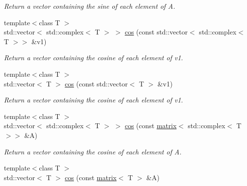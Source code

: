 \begin{DoxyCompactItemize}
\begin{DoxyCompactList}\small\item\em Return a vector containing the sine of each element of A. \end{DoxyCompactList}\item 
\hypertarget{namespacekeycpp_a9b3d958e47ae678b0818a166d5a75883}{{\footnotesize template$<$class T $>$ }\\std\-::vector$<$ std\-::complex$<$ T $>$ $>$ \hyperlink{namespacekeycpp_a9b3d958e47ae678b0818a166d5a75883}{cos} (const std\-::vector$<$ std\-::complex$<$ T $>$$>$ \&v1)}\label{namespacekeycpp_a9b3d958e47ae678b0818a166d5a75883}

\begin{DoxyCompactList}\small\item\em Return a vector containing the cosine of each element of v1. \end{DoxyCompactList}\item 
\hypertarget{namespacekeycpp_a51d6592d124735f2377e1a2c43985b94}{{\footnotesize template$<$class T $>$ }\\std\-::vector$<$ T $>$ \hyperlink{namespacekeycpp_a51d6592d124735f2377e1a2c43985b94}{cos} (const std\-::vector$<$ T $>$ \&v1)}\label{namespacekeycpp_a51d6592d124735f2377e1a2c43985b94}

\begin{DoxyCompactList}\small\item\em Return a vector containing the cosine of each element of v1. \end{DoxyCompactList}\item 
\hypertarget{namespacekeycpp_a6b8f8e6c241ddcb678acf54c03a89b08}{{\footnotesize template$<$class T $>$ }\\std\-::vector$<$ std\-::complex$<$ T $>$ $>$ \hyperlink{namespacekeycpp_a6b8f8e6c241ddcb678acf54c03a89b08}{cos} (const \hyperlink{classkeycpp_1_1matrix}{matrix}$<$ std\-::complex$<$ T $>$$>$ \&A)}\label{namespacekeycpp_a6b8f8e6c241ddcb678acf54c03a89b08}

\begin{DoxyCompactList}\small\item\em Return a vector containing the cosine of each element of A. \end{DoxyCompactList}\item 
\hypertarget{namespacekeycpp_abc28105b536bc99365073d7cbe0f9910}{{\footnotesize template$<$class T $>$ }\\std\-::vector$<$ T $>$ \hyperlink{namespacekeycpp_abc28105b536bc99365073d7cbe0f9910}{cos} (const \hyperlink{classkeycpp_1_1matrix}{matrix}$<$ T $>$ \&A)}\label{namespacekeycpp_abc28105b536bc99365073d7cbe0f9910}


\end{DoxyCompactItemize}
